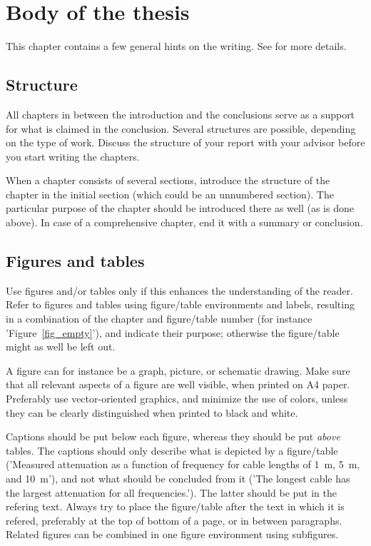 \chapter{Body of the thesis}
\label{chap:body}

This chapter contains a few general hints on the writing. See \cite{Leferink12,Meijerink12} for more details.

\section{Structure}
\label{sec:structure}

All chapters in between the introduction and the conclusions serve as a support for what is claimed in the conclusion. Several structures are possible, depending on the type of work. Discuss the structure of your report with your advisor before you start writing the chapters.

When a chapter consists of several sections, introduce the structure of the chapter in the initial section (which could be an unnumbered section). The particular purpose of the chapter should be introduced there as well (as is done above). In case of a comprehensive chapter, end it with a summary or conclusion.

\section{Figures and tables}
\label{sec:figures}
Use figures and/or tables only if this enhances the understanding of the reader. Refer to figures and tables using figure/table environments and labels, resulting in a combination of the chapter and figure/table number (for instance 'Figure~\ref{fig_empty}'), and indicate their purpose; otherwise the figure/table might as well be left out.  

A figure can for instance be a graph, picture, or schematic drawing. Make sure that all relevant aspects of a figure are well visible, when printed on A4 paper. Preferably use vector-oriented graphics, and minimize the use of colors, unless they can be clearly distinguished when printed to black and white.

Captions should be put below each figure, whereas they should be put \emph{above} tables. The captions should only describe what is depicted by a figure/table ('Measured attenuation as a function of frequency for cable lengths of 1~m, 5~m, and 10~m'), and not what should be concluded from it ('The longest cable has the largest attenuation for all frequencies.'). The latter should be put in the refering text. Always try to place the figure/table after the text in which it is refered, preferably at the top of bottom of a page, or in between paragraphs. Related figures can be combined in one figure environment using subfigures. 

